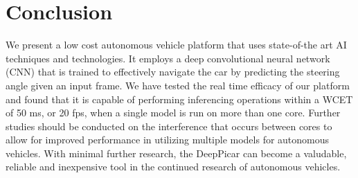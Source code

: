 \section{Conclusion}\label{sec:conclusion}

We present a low cost autonomous vehicle platform that uses state-of-the art AI techniques and 
technologies. It employs a deep convolutional neural network (CNN) that is trained to effectively 
navigate the car by predicting the steering angle given an input frame. We have tested the real time 
efficacy of our platform and found that it is capable of performing inferencing operations within a WCET 
of 50 ms, or 20 fps, when a single model is run on more than one core. Further studies should be 
conducted on the interference that occurs between cores to allow for improved performance in utilizing 
multiple models for autonomous vehicles. With minimal further research, the DeepPicar can 
become a valudable, reliable and inexpensive tool in the continued research of autonomous vehicles.